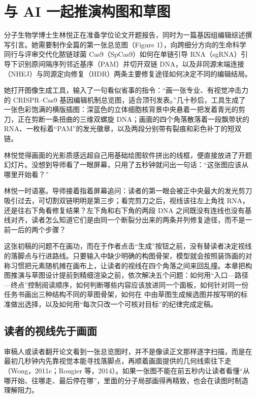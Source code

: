 \chapter{与 AI 一起推演构图和草图}
\usetikzlibrary{decorations.pathreplacing}

分子生物学博士生林悦正在准备学位论文开题报告，同时为一篇基因组编辑综述撰写引言。她需要制作全篇的第一张总览图（Figure 1），向跨细分方向的生命科学同行与评审交代化脓链球菌 Cas9（SpCas9）如何在单链引导 RNA（sgRNA）引导下识别原间隔序列邻近基序（PAM）并切开双链 DNA，以及非同源末端连接（NHEJ）与同源定向修复（HDR）两条主要修复途径如何决定不同的编辑结局。

她打开图像生成工具，输入了一句看似省事的指令：“画一张专业、有视觉冲击力的 CRISPR–Cas9 基因编辑机制总览图，适合顶刊发表。”几十秒后，工具生成了一张色彩饱满的横版插图：深蓝色的立体细胞核背景中央悬着一把发着青光的剪刀，正在剪断一条扭曲的三维双螺旋 DNA；画面的四个角落散落着一段飘带状的 RNA、一枚标着“PAM”的发光徽章，以及两段分别带有裂痕和彩色补丁的短双链。

林悦觉得画面的光影质感远超自己用基础绘图软件拼出的线框，便直接放进了开题幻灯片。没想到导师看了一眼屏幕，只用了五秒钟就问出一句话：“这张图应该从哪里开始看？”

林悦一时语塞。导师接着指着屏幕追问：读者的第一眼会被正中央最大的发光剪刀吸引过去，可切割双链明明是第三步；看完剪刀之后，视线该往左上角找 RNA，还是往右下角看修复结果？左下角和右下角的两段 DNA 之间既没有连线也没有基线对齐，读者怎么知道它们是由同一个断裂分出来的两条并列修复途径，而不是一前一后的两个步骤？

这张初稿的问题不在画功，而在于作者点击“生成”按钮之前，没有替读者决定视线的落脚点与行进路线。只要输入中缺少明确的构图骨架，模型就会按照装饰画的对称习惯把元素随机摊在画布上，让读者的视线在四个角落之间来回乱撞。本章把构图推演与草图设计提前到精细渲染之前，依次解决五个问题：如何用“入口—路径—终点”控制阅读顺序，如何判断哪些内容应该放进同一个面板，如何针对同一份任务书画出三种结构不同的草图骨架，如何在 \scidraw{} 中由草图生成候选图并按写明的标准做出选择，以及如何用“每次只改一个可核对目标”的纪律完成定稿。

\section{读者的视线先于画面}

审稿人或读者翻开论文看到一张总览图时，并不是像读正文那样逐字扫描，而是在最初几秒钟内先靠视觉本能寻找落脚点，再顺着画面提供的几何线索往下走（Wong，2011c；Rougier 等，2014）。如果一张图不能在前五秒内让读者看懂“从哪开始、往哪走、最后停在哪”，里面的分子局部画得再精致，也会在读图时制造理解阻力。

